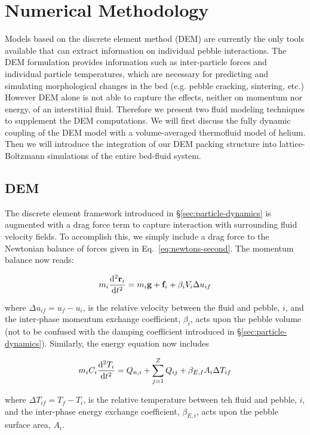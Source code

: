 \section{Numerical Methodology}
Models based on the discrete element method (DEM) are currently the only tools available that can extract information on individual pebble interactions. The DEM formulation provides information such as inter-particle forces and individual particle temperatures, which are necessary for predicting and simulating morphological changes in the bed (e.g. pebble cracking, sintering, etc.) However DEM alone is not able to capture the effects, neither on momentum nor energy, of an interstitial fluid. Therefore we present two fluid modeling techniques to supplement the DEM computations. We will first discuss the fully dynamic coupling of the DEM model with a volume-averaged thermofluid model of helium. Then we will introduce the integration of our DEM packing structure into lattice-Boltzmann simulations of the entire bed-fluid system.

\subsection{DEM}\label{sec:cfdem-heat-transfer}
The discrete element framework introduced in \S\ref{sec:particle-dynamics} is augmented with a drag force term to capture interaction with surrounding fluid velocity fields. To accomplish this, we simply include a drag force to the Newtonian balance of forces given in Eq.~\ref{eq:newtons-second}. The momentum balance now reads:

\begin{equation}\label{eq:cfdem-dem-momentum}
	m_i  \frac{\mathrm{d}^2{\mathbf{r}_i}}{\mathrm{d}t^2} = m_i\mathbf{g} + \mathbf{f}_i + \beta_i V_i \Delta u_{if}
\end{equation}

where $\Delta u_{if} = u_f - u_i$, is the relative velocity between the fluid and pebble, $i$, and the inter-phase momentum exchange coefficient, $\beta_i$, acts upon the pebble volume (not to be confused with the damping coefficient introduced in \S\ref{sec:particle-dynamics}). Similarly, the energy equation now includes 

\begin{equation}\label{eq:cfdem-dem-energy}
	m_iC_i \frac{\mathrm{d}^2{T_i}}{\mathrm{d}t^2} = Q_{n,i} + \sum_{j=1}^Z Q_{ij} + \beta_{E,I} A_i \Delta T_{if}
\end{equation}

where $\Delta T_{if} = T_f - T_i$, is the relative temperature between teh fluid and pebble, $i$, and the inter-phase energy exchange coefficient, $\beta_{E,i}$, acts upon the pebble surface area, $A_i$.

